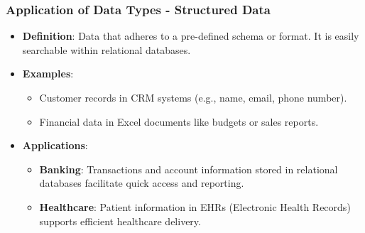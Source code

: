 \documentclass{beamer}
\begin{document}
\begin{frame}[fragile]
    \frametitle{Application of Data Types - Structured Data}
    \begin{itemize}
        \item \textbf{Definition}: Data that adheres to a pre-defined schema or format. It is easily searchable within relational databases.
        \item \textbf{Examples}:
            \begin{itemize}
                \item Customer records in CRM systems (e.g., name, email, phone number).
                \item Financial data in Excel documents like budgets or sales reports.
            \end{itemize}
        \item \textbf{Applications}:
            \begin{itemize}
                \item \textbf{Banking}: Transactions and account information stored in relational databases facilitate quick access and reporting.
                \item \textbf{Healthcare}: Patient information in EHRs (Electronic Health Records) supports efficient healthcare delivery.
            \end{itemize}
    \end{itemize}
\end{frame}
\end{document}
